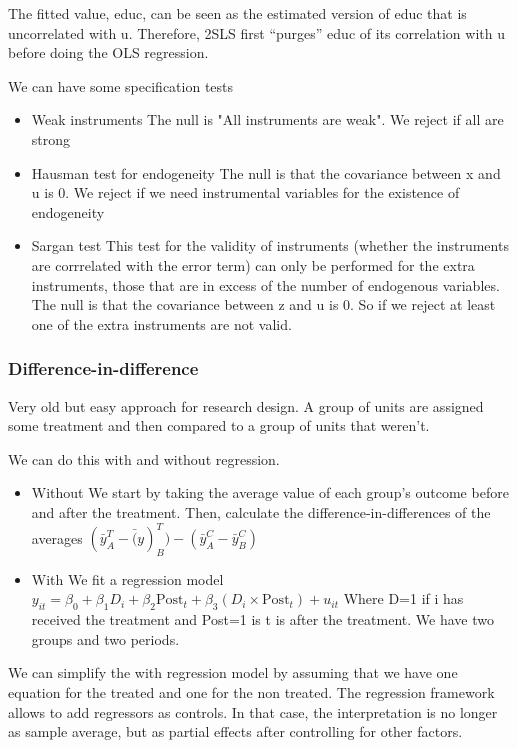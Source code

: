 The fitted value, educ, can be seen as the estimated version of educ that is uncorrelated
with u. Therefore, 2SLS first “purges” educ of its correlation with u before doing the OLS regression.

\vspace{10pt}

We can have some specification tests

\begin{itemize}
    \item Weak instruments \ra The null is "All instruments are weak". We reject if all are strong
    \item Hausman test for endogeneity \ra The null is that the covariance between x and u is 0. We reject if we need instrumental variables for the existence of endogeneity
    \item Sargan test \ra This test for the validity of instruments (whether the instruments are corrrelated with the
error term) can only be performed for the extra instruments, those that are in excess of the
number of endogenous variables. The null is that the covariance between z and u is 0. So if we reject at least one of the extra instruments are not valid.
\end{itemize}

\subsubsection{Difference-in-difference}

Very old but easy approach for research design. A group of units are assigned some treatment and then compared to a group of units that
weren't.

We can do this with and without regression.

\begin{itemize}
    \item Without \ra  We start by taking the average value of each group's outcome before and after the treatment. Then, calculate the difference-in-differences of the averages $(\bar{y}^T_A-\bar(y)^T_B)- (\bar{y}^C_A - \bar{y}^C_B)$
    \item With \ra We fit a regression model $y_{it} = \beta_0 + \beta_1D_i + \beta_2 \text{Post}_t + \beta_3(D_i \times\text{Post}_t) + u_{it}$ Where D=1 if i has received the treatment and Post=1 is t is after the treatment. We have two groups and two periods.
\end{itemize}


We can simplify the with regression model by assuming that we have one equation for the treated and one for the non treated. The regression framework allows to add regressors as controls. In that case, the
interpretation is no longer as sample average, but as partial effects after controlling for
other factors.


